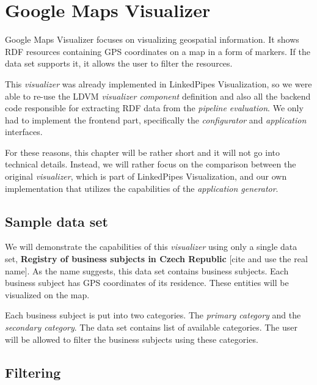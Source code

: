 \section{Google Maps Visualizer}
%
%
%
Google Maps Visualizer focuses on visualizing geospatial information. It shows RDF resources containing GPS coordinates on a map in a form of markers. If the data set supports it, it allows the user to filter the resources.

This \emph{visualizer} was already implemented in LinkedPipes Visualization, so we were able to re-use the LDVM \emph{visualizer component} definition and also all the backend code responsible for extracting RDF data from the \emph{pipeline evaluation}. We only had to implement the frontend part, specifically the \emph{configurator} and \emph{application} interfaces.

For these reasons, this chapter will be rather short and it will not go into technical details. Instead, we will rather focus on the comparison between the original \emph{visualizer}, which is part of LinkedPipes Visualization, and our own implementation that utilizes the capabilities of the \emph{application generator}. 

\subsection{Sample data set}

We will demonstrate the capabilities of this \emph{visualizer} using only a single data set, \textbf{Registry of business subjects in Czech Republic} [cite and use the real name]. As the name suggests, this data set contains business subjects. Each business subject has GPS coordinates of its residence. These entities will be visualized on the map.

Each business subject is put into two categories. The \emph{primary category} and the \emph{secondary category}. The data set contains list of available categories. The user will be allowed to filter the business subjects using these categories.

\subsection{Filtering}

